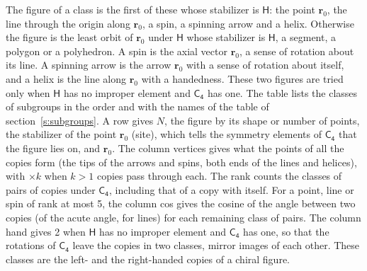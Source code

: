 \documentclass[10pt,a4paper]{article}
\numberwithin{equation}{section}
\newcommand{\grp}[1]{\mathsf{#1}}
\newcommand{\pointr}{\mathbf{r}}
\begin{document}
\leavevmode\label{n:head.figure}The figure of a class is the first of these whose stabilizer is $\grp{H}$: the point $\pointr_0$, the line through the origin along $\pointr_0$, a spin, a spinning arrow and a helix. Otherwise the figure is the least orbit of $\pointr_0$ under $\grp{H}$ whose stabilizer is $\grp{H}$, a segment, a polygon or a polyhedron. A spin is the axial vector $\pointr_0$, a sense of rotation about its line. A spinning arrow is the arrow $\pointr_0$ with a sense of rotation about itself, and a helix is the line along $\pointr_0$ with a handedness. These two figures are tried only when $\grp{H}$ has no improper element and $\grp{C_{4}}$ has one. The table lists the classes of subgroups in the order and with the names of the table of section~\ref{s:subgroups}. \label{n:head.site}A row gives $N$, the figure by its shape or number of points, the stabilizer of the point $\pointr_0$ (site), which tells the symmetry elements of $\grp{C_{4}}$ that the figure lies on, and $\pointr_0$. \label{n:head.vertices}The column vertices gives what the points of all the copies form (the tips of the arrows and spins, both ends of the lines and helices), with ${\times}k$ when $k > 1$ copies pass through each. \label{n:head.rank}The rank counts the classes of pairs of copies under $\grp{C_{4}}$, including that of a copy with itself. \label{n:head.cos}For a point, line or spin of rank at most 5, the column cos gives the cosine of the angle between two copies (of the acute angle, for lines) for each remaining class of pairs. \label{n:head.hand}The column hand gives 2 when $\grp{H}$ has no improper element and $\grp{C_{4}}$ has one, so that the rotations of $\grp{C_{4}}$ leave the copies in two classes, mirror images of each other. These classes are the left- and the right-handed copies of a chiral figure.
\end{document}
